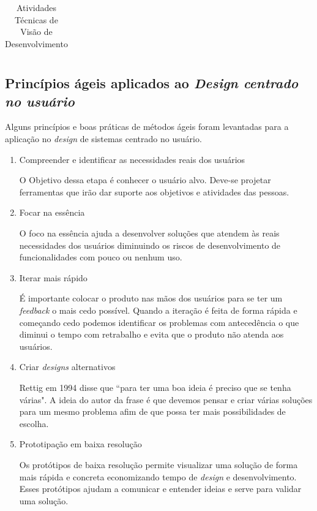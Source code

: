 \begin{itemize}
\begin{table}[h]
\begin{tabular}{|l|l|l|l|l|}
\end{tabular}
\caption{Atividades Técnicas de Visão de Desenvolvimento}
\end{table}

\end{itemize}

\newpage

\subsection{Princípios ágeis aplicados ao \emph{Design centrado no usuário}}

	Alguns princípios e boas práticas de métodos ágeis foram levantadas para a aplicação no \emph{design} de sistemas centrado no usuário.

\begin{enumerate}

\item Compreender e identificar as necessidades reais dos usuários

O Objetivo dessa etapa é conhecer o usuário alvo. Deve-se projetar ferramentas que irão dar suporte aos objetivos e atividades das pessoas.

\item Focar na essência

O foco na essência ajuda a desenvolver soluções que atendem às reais necessidades dos usuários diminuindo os riscos de desenvolvimento de funcionalidades com pouco ou nenhum uso.


\item Iterar mais rápido

	É importante colocar o produto nas mãos dos usuários para se ter um \textit{feedback} o mais cedo possível. Quando a iteração é feita de forma rápida e começando cedo podemos identificar os problemas com antecedência o que diminui o tempo com retrabalho e evita que o produto não atenda aos usuários.
	

\item Criar \emph{designs} alternativos

	Rettig em 1994 disse que ``para ter uma boa ideia é preciso que se tenha várias". A ideia do autor da frase é que devemos pensar e criar várias soluções para um mesmo problema afim de que possa ter mais possibilidades de escolha. 


\item Prototipação em baixa resolução

Os protótipos de baixa resolução permite visualizar uma solução de forma mais rápida e concreta economizando tempo de \emph{design} e desenvolvimento. Esses protótipos ajudam a comunicar e entender ideias e serve para validar uma solução. 


\end{enumerate}
